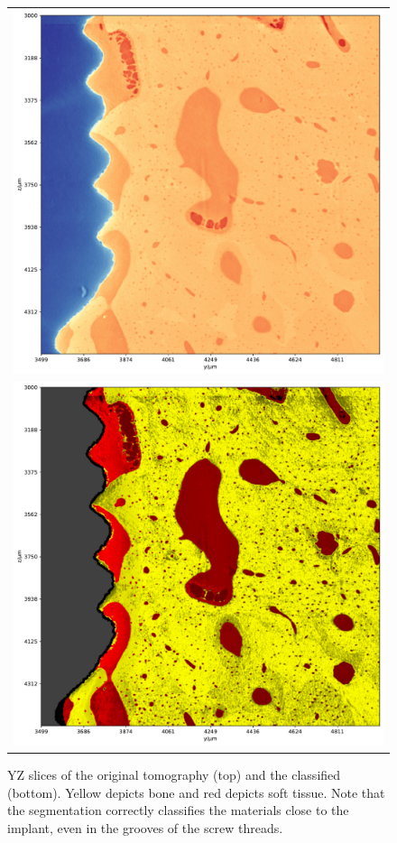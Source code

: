 \begin{figure}
    \centering
    \begin{tabular}{c}
        \includegraphics[width=.7\linewidth]{generated/770c_pag_segmented_zy_raw.pdf} \\
        \includegraphics[width=.7\linewidth]{generated/770c_pag_segmented_zy_colored.pdf}
    \end{tabular}
    \caption{
        YZ slices of the original tomography (top) and the classified (bottom).
        Yellow depicts bone and red depicts soft tissue. Note that the
        segmentation correctly classifies the materials close to the implant,
        even in the grooves of the screw threads.
    }
    \label{fig:histology-comparison2}
\end{figure}

